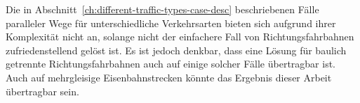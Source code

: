 \documentclass[../main/thesis.tex]{subfiles}
\begin{document}
Die in Abschnitt~\ref{ch:different-traffic-types-case-desc} beschriebenen Fälle paralleler Wege für unterschiedliche Verkehrsarten bieten sich aufgrund ihrer Komplexität nicht an, solange nicht der einfachere Fall von Richtungsfahrbahnen zufriedenstellend gelöst ist.
Es ist jedoch denkbar, dass eine Lösung für baulich getrennte Richtungsfahrbahnen auch auf einige solcher Fälle übertragbar ist.
Auch auf mehrgleisige Eisenbahnstrecken könnte das Ergebnis dieser Arbeit übertragbar sein.







\onlyinsubfile{\listoffigures}
\end{document}

